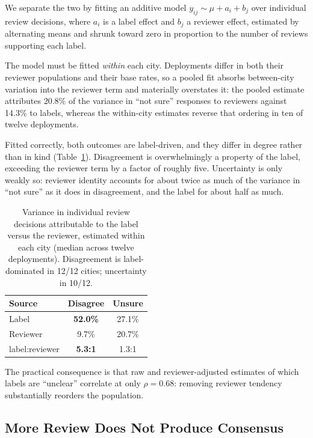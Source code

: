 We separate the two by fitting an additive model
$y_{ij} \sim \mu + a_i + b_j$ over individual review decisions, where $a_i$ is a
label effect and $b_j$ a reviewer effect, estimated by alternating means and
shrunk toward zero in proportion to the number of reviews supporting each label.

The model must be fitted \emph{within} each city. Deployments differ in both
their reviewer populations and their base rates, so a pooled fit absorbs
between-city variation into the reviewer term and materially overstates it: the
pooled estimate attributes 20.8\% of the variance in ``not sure'' responses to
reviewers against 14.3\% to labels, whereas the within-city estimates reverse
that ordering in ten of twelve deployments.

Fitted correctly, both outcomes are label-driven, and they differ in degree
rather than in kind (Table~\ref{tab:variance}). Disagreement is overwhelmingly
a property of the label, exceeding the reviewer term by a factor of roughly
five. Uncertainty is only weakly so: reviewer identity accounts for about twice
as much of the variance in ``not sure'' as it does in disagreement, and the
label for about half as much.

\begin{table}[tb]\centering
\caption{Variance in individual review decisions attributable to the label
versus the reviewer, estimated within each city (median across twelve
deployments). Disagreement is label-dominated in 12/12 cities; uncertainty in
10/12.}
\label{tab:variance}
\begin{tabular}{lcc}
\hline
\textbf{Source} & \textbf{Disagree} & \textbf{Unsure} \\
\hline
Label     & \textbf{52.0\%} & 27.1\% \\
Reviewer  & 9.7\%  & 20.7\% \\
label:reviewer & \textbf{5.3:1} & 1.3:1 \\
\hline
\end{tabular}
\end{table}

The practical consequence is that raw and reviewer-adjusted estimates of which
labels are ``unclear'' correlate at only $\rho = 0.68$: removing reviewer
tendency substantially reorders the population.

\subsection{More Review Does Not Produce Consensus}

